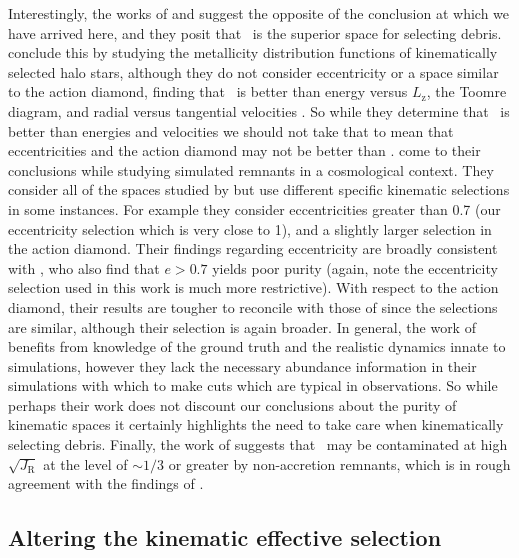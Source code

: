 Interestingly, the works of \textcite{feuillet20} and \parencite{carrillo23} suggest the opposite of the conclusion at which we have arrived here, and they posit that \JRLz\ is the superior space for selecting \gse debris. \textcite{feuillet20} conclude this by studying the metallicity distribution functions of kinematically selected halo stars, although they do not consider eccentricity or a space similar to the action diamond, finding that \JRLz\ is better than energy versus $L_\mathrm{z}$, the Toomre diagram, and radial versus tangential velocities \parencite[this is actually consistent with the conclusions of ][]{lane22}. So while they determine that \JRLz\ is better than energies and velocities we should not take that to mean that eccentricities and the action diamond may not be better than \JRLz. \textcite{carrillo23} come to their conclusions while studying simulated \gse remnants in a cosmological context. They consider all of the spaces studied by \cite{lane22} but use different specific kinematic selections in some instances. For example they consider eccentricities greater than 0.7 (our eccentricity selection which is very close to 1), and a slightly larger selection in the action diamond. Their findings regarding eccentricity are broadly consistent with \cite{lane22}, who also find that $e > 0.7$ yields poor purity (again, note the eccentricity selection used in this work is much more restrictive). With respect to the action diamond, their results are tougher to reconcile with those of \cite{lane22} since the selections are similar, although their selection is again broader. In general, the work of \textcite{carrillo23} benefits from knowledge of the ground truth and the realistic dynamics innate to simulations, however they lack the necessary abundance information in their simulations with which to make cuts which are typical in observations. So while perhaps their work does not discount our conclusions about the purity of kinematic spaces it certainly highlights the need to take care when kinematically selecting \gse debris. Finally, the work of \textcite{donlon23} suggests that \JRLz\ may be contaminated at high $\sqrt{J_\mathrm{R}}$ at the level of $\sim 1/3$ or greater by non-\gse accretion remnants, which is in rough agreement with the findings of \cite{lane22}.

\subsection{Altering the kinematic effective selection}
\label{ch3:subsec:altering-kinematic-effective-selection-function}

